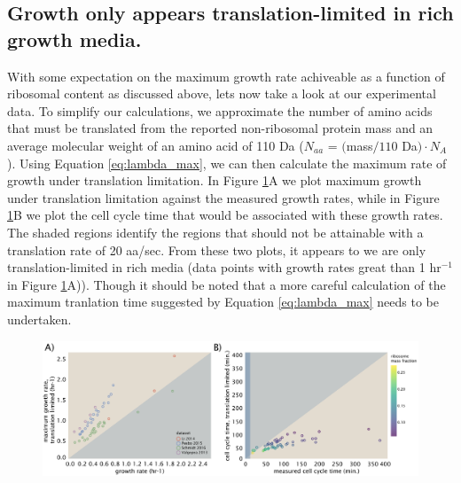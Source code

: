 \documentclass[11pt, letterpaper]{article}
\begin{document}
\subsection{Growth only appears translation-limited in rich growth media.}


With some expectation on the maximum growth rate achiveable as a function of
ribosomal content as discussed above, lets now take a look at our experimental
data. To simplify our calculations, we approximate the number of amino acids
that must be translated from the reported non-ribosomal protein mass and an
average molecular weight of an amino acid of 110 Da ($N_{aa}$ = $($mass$ / 110$
Da$) \cdot N_A$). Using Equation \ref{eq:lambda_max}, we can then calculate the
maximum rate of growth under translation limitation. In Figure
\ref{fig:estimates_translation_data}A we plot maximum growth under translation
limitation against the measured growth rates, while in Figure
\ref{fig:estimates_translation_data}B we plot the cell cycle time that would be
associated with these growth rates. The shaded regions identify the regions that
should not be attainable with a translation rate of 20 aa/sec. From these two
plots, it appears to we are only translation-limited in rich media (data points
with growth rates great than 1 hr$^{-1}$ in Figure
\ref{fig:estimates_translation_data}A)). Though it should be noted that a more
careful  calculation of the maximum tranlation time suggested by Equation
\ref{eq:lambda_max} needs to be undertaken.

\begin{figure}[H]
		\centering
    \includegraphics[width=1\textwidth]{../../code/figures/SI/estimates_translation_data.pdf}
  \caption{}
  \label{fig:estimates_translation_data}
\end{figure}

\end{document}
